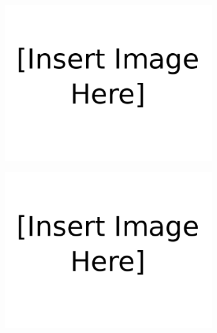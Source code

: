 \begin{figure}[H]
\begin{subfigure}[b]{0.48\textwidth}
            \caption{}
            \label{fig:test2}
        \end{subfigure}
        \begin{subfigure}[b]{0.48\textwidth}   
            \centering 
            \includegraphics[width=\textwidth]{figures/Insert_image_here.png}
            \caption{}
            \label{fig:test3}
        \end{subfigure}
        \hfill
        \begin{subfigure}[b]{0.48\textwidth}   
            \centering 
            \includegraphics[width=\textwidth]{figures/Insert_image_here.png}  
            \caption{}   
            \label{fig:test4}
        \end{subfigure} 

\end{figure}
